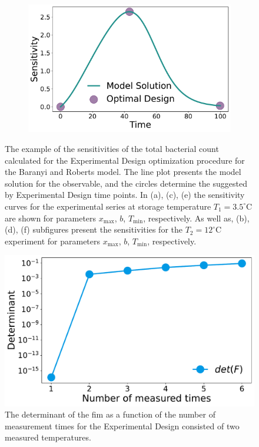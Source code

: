 \documentclass[graybox]{svmult}
\begin{document}
\begin{figure}[H]
\begin{subfigure}{.5\textwidth}
    \end{subfigure}
    \begin{subfigure}{.5\textwidth}
          \centering
          \includegraphics[scale=0.25]{Figures/Fig7f.pdf}
        \end{subfigure}
    \caption{{\footnotesize The example of the sensitivities of the total bacterial count calculated for the Experimental Design optimization procedure for the Baranyi and Roberts model.
    The line plot presents the model solution for the observable, and the circles determine the suggested by Experimental Design time points.
    In (a), (c), (e) the sensitivity curves for the experimental series at storage temperature $T_1=3.5^\circ$C are shown for parameters $x_\text{max}$, $b$, $T_\text{min}$, respectively.
    As well as, (b), (d), (f) subfigures present the sensitivities for the $T_2=12^\circ$C experiment for parameters $x_\text{max}$, $b$, $T_\text{min}$, respectively.}}
    \label{Fig7}
\end{figure}
%
%
\begin{figure}[H]
    \centering
    \includegraphics[scale=0.3]{Figures/Fig8.pdf}
    \caption{The determinant of the \ac{fim} as a function of the number of measurement times for the Experimental Design consisted of two measured temperatures.}
    \label{Fig8}
\end{figure}
\end{document}
